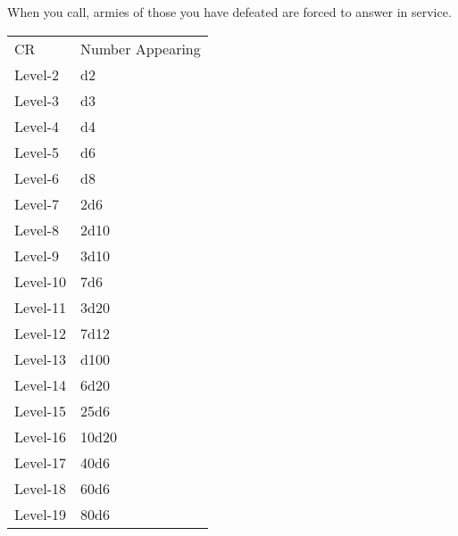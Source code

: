 {When you call, armies of those you have defeated are forced to answer in service.}

	\begin{small}
	\begin{tabular}{ll}%
	CR  &Number Appearing\\
	Level-2   &d2\\
	Level-3   &d3\\
	Level-4   &d4\\
	Level-5   &d6\\
	Level-6   &d8\\
	Level-7   &2d6\\
	Level-8   &2d10\\
	Level-9   &3d10\\
	Level-10  &7d6\\
	Level-11  &3d20\\
	Level-12  &7d12\\
	Level-13  &d100\\
	Level-14  &6d20\\
	Level-15  &25d6\\
	Level-16  &10d20\\
	Level-17  &40d6\\
	Level-18  &60d6\\
	Level-19  &80d6\\
	\end{tabular}
	\end{small}